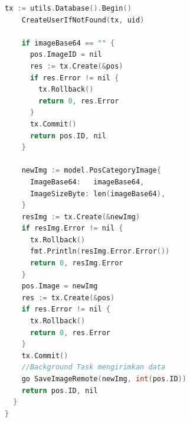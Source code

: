 \begin{lstlisting}[style=mystyle, language=C, caption={Penerapan di Sisi Service-10 di kasus menambahkan PosCategory}]
    tx := utils.Database().Begin()
    CreateUserIfNotFound(tx, uid)

    if imageBase64 == "" {
      pos.ImageID = nil
      res := tx.Create(&pos)
      if res.Error != nil {
        tx.Rollback()
        return 0, res.Error
      }
      tx.Commit()
      return pos.ID, nil
    }

    newImg := model.PosCategoryImage{
      ImageBase64:   imageBase64,
      ImageSizeByte: len(imageBase64),
    }
    resImg := tx.Create(&newImg)
    if resImg.Error != nil {
      tx.Rollback()
      fmt.Println(resImg.Error.Error())
      return 0, resImg.Error
    }
    pos.Image = newImg
    res := tx.Create(&pos)
    if res.Error != nil {
      tx.Rollback()
      return 0, res.Error
    }
    tx.Commit()
    //Background Task mengirimkan data
    go SaveImageRemote(newImg, int(pos.ID))
    return pos.ID, nil
  }
}
 
\end{lstlisting} 